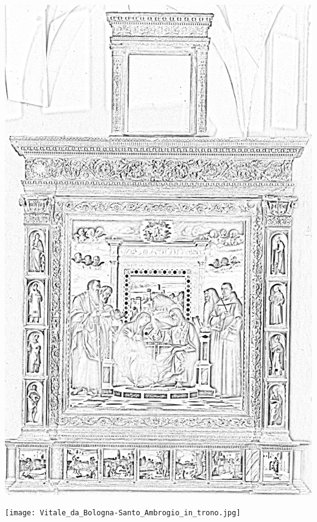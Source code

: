 \documentclass[hidelinks,12pt,a4paper]{article}
\begin{document}
\begin{adjustwidth}{-30mm}{-30mm}
			\thispagestyle{empty}
			\begin{minipage}{0.91\linewidth}
				\centering
				\includegraphics[scale=0.2]{Bellini_Giovanni-Incoronazione_della_Vergine.jpg}
			\end{minipage}
			
			\vspace*{\fill}
			\newpage
			
			\thispagestyle{empty}
			\begin{minipage}{0.91\linewidth}
				\centering
				\texttt{[image: Vitale\_da\_Bologna-Santo\_Ambrogio\_in\_trono.jpg]}
			\end{minipage}
			

\end{adjustwidth}
\end{document}
